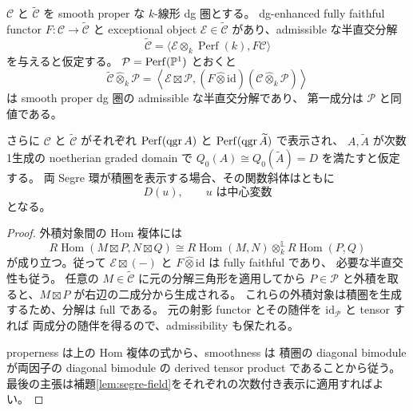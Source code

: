 \begin{proposition}\label{blowup:product-proposition}
$\mathcal C$ と $\widetilde{\mathcal C}$ を smooth proper な $k$-線形 dg 圏とする。
dg-enhanced fully faithful functor
$F\colon\mathcal C\to\widetilde{\mathcal C}$ と exceptional object
$\mathcal E\in\widetilde{\mathcal C}$ があり、admissible な半直交分解
\[
 \widetilde{\mathcal C}
 =\langle\mathcal E\otimes_k\operatorname{Perf}(k),F\mathcal C\rangle
\]
を与えると仮定する。
$\mathcal P=\operatorname{Perf}(\mathbb P^1)$ とおくと
\begin{equation}\label{blowup:product-sod}
 \widetilde{\mathcal C}\widehat\otimes_k\mathcal P
 =\left\langle
      \mathcal E\boxtimes\mathcal P,
      (F\widehat\otimes\mathrm{id})
      (\mathcal C\widehat\otimes_k\mathcal P)
   \right\rangle
\end{equation}
は smooth proper dg 圏の admissible な半直交分解であり、
第一成分は $\mathcal P$ と同値である。

さらに $\mathcal C$ と $\widetilde{\mathcal C}$ がそれぞれ
$\operatorname{Perf}(\operatorname{qgr} A)$ と $\operatorname{Perf}(\operatorname{qgr}\widetilde A)$ で表示され、
$A,\widetilde A$ が次数1生成の noetherian graded domain で
$Q_0(A)\cong Q_0(\widetilde A)=D$ を満たすと仮定する。
両 Segre 環が積圏を表示する場合、その関数斜体はともに
\begin{equation}\label{blowup:product-field}
 D(u),\qquad u\text{ は中心変数}
\end{equation}
となる。
\end{proposition}

\begin{proof}
外積対象間の Hom 複体には
\[
 R\operatorname{Hom}(M\boxtimes P,N\boxtimes Q)
 \cong
 R\operatorname{Hom}(M,N)\otimes_k^{\mathbb L}
 R\operatorname{Hom}(P,Q)
\]
が成り立つ。従って
$\mathcal E\boxtimes(-)$ と $F\widehat\otimes\mathrm{id}$ は fully faithful であり、
必要な半直交性も従う。
任意の $M\in\widetilde{\mathcal C}$ に元の分解三角形を適用してから
$P\in\mathcal P$ と外積を取ると、$M\boxtimes P$ が右辺の二成分から生成される。
これらの外積対象は積圏を生成するため、分解は full である。
元の射影 functor とその随伴を $\mathrm{id}_{\mathcal P}$ と tensor すれば
両成分の随伴を得るので、admissibility も保たれる。

properness は上の Hom 複体の式から、smoothness は
積圏の diagonal bimodule が両因子の diagonal bimodule の derived tensor product
であることから従う。
最後の主張は補題\ref{lem:segre-field}をそれぞれの次数付き表示に適用すればよい。
\end{proof}

